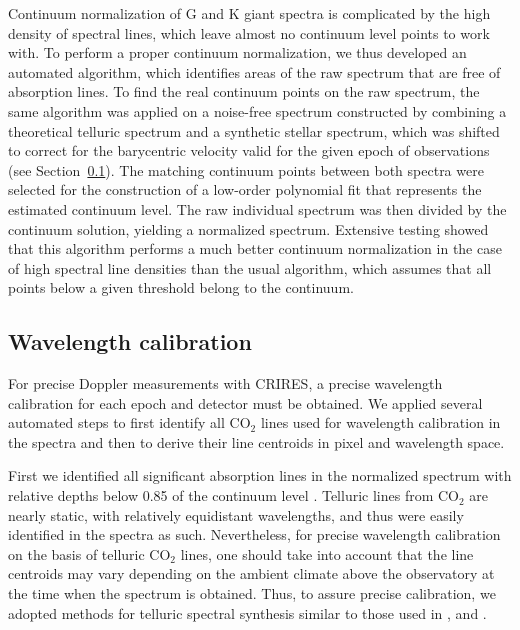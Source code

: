 \documentclass{aa}
\begin{document}
Continuum normalization of G and K giant spectra is complicated by the high density of spectral lines,
which leave almost no continuum level points to work with.
To perform a proper continuum normalization, we thus developed an automated algorithm, which identifies areas of the
raw spectrum that are free of absorption lines. To find the real continuum points on the raw spectrum,
the same algorithm was applied on a noise-free spectrum constructed by combining a
theoretical telluric spectrum and a synthetic stellar spectrum, 
which was shifted to correct for the barycentric velocity
valid for the given epoch of observations (see Section~\ref{Wavelength calibration}). 
The matching continuum points between both spectra were selected for the construction of a low-order polynomial 
fit that represents the estimated continuum level. 
The raw individual spectrum was then divided by the continuum solution, yielding a normalized spectrum.
Extensive testing showed that this algorithm performs a much better continuum normalization
in the case of high spectral line densities than the usual algorithm, which assumes that all
points below a given threshold belong to the continuum.

 
\subsection{Wavelength calibration}
\label{Wavelength calibration}

For precise Doppler measurements with CRIRES, a precise wavelength calibration for each epoch and detector 
must be obtained. We applied several automated steps  to first identify all CO$_2$ lines 
used for wavelength calibration in the spectra and then to derive their line centroids in pixel and wavelength space.
 
First we identified all significant absorption lines in the normalized spectrum 
with relative depths below 0.85 of the continuum level \citep{Pepe}.
Telluric lines from CO$_2$ are nearly static, with relatively equidistant wavelengths, and 
thus were easily identified in the spectra as such. 
Nevertheless, for precise wavelength calibration on the basis of telluric CO$_2$ lines,
one should take into account that the line centroids may vary depending 
on the ambient climate above the observatory at the time when the spectrum is obtained. 
Thus, to assure precise calibration, we adopted methods for telluric spectral synthesis 
similar to those used in \citet{Seifahrt2008}, \citet{Seifahrt2010} and \citet{Lebzelter2012}. 
\end{document}
